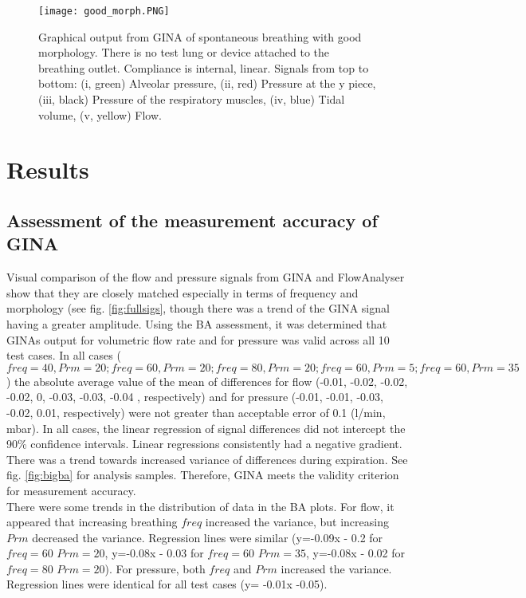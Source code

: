\documentclass[12pt, openany, oneside]{book}
\begin{document}

\begin{figure}
\centering
\texttt{[image: good\_morph.PNG]}		
	\caption[GINA spontaneous breaths with good morphology]{Graphical output from GINA of spontaneous breathing with good morphology. There is no test lung or device attached to the breathing outlet. Compliance is internal, linear. Signals from top to bottom: (i, green) Alveolar pressure, (ii, red) Pressure at the y piece, (iii, black) Pressure of the respiratory muscles, (iv, blue) Tidal volume, (v, yellow) Flow. }
	\label{fig:goodmorph}
\end{figure}


\section{Results}

\subsection{Assessment of the measurement accuracy of GINA}

Visual comparison of the flow and pressure signals from GINA and FlowAnalyser show that they are closely matched especially in terms of frequency and morphology (see fig. \ref{fig:fullsigs}, though there was a trend of the GINA signal having a greater amplitude. Using the BA assessment, it was determined that GINAs output for volumetric flow rate and for pressure was valid across all 10 test cases. In all cases ($freq = 40, Prm = 20; freq = 60, Prm = 20; freq = 80, Prm = 20; freq = 60, Prm = 5; freq = 60, Prm = 35$) the absolute average value of the mean of differences for flow (-0.01, -0.02, -0.02, -0.02, 0, -0.03, -0.03, -0.04 , respectively) and for pressure (-0.01, -0.01, -0.03, -0.02,  0.01, respectively)  were not greater than acceptable error of 0.1 (l/min, mbar). In all cases, the linear regression of signal differences did not intercept the 90{\%} confidence intervals. Linear regressions consistently had a negative gradient. There was a trend towards increased variance of differences during expiration. See fig. \ref{fig:bigba} for analysis samples. Therefore, GINA meets the validity criterion for measurement accuracy.\\

There were some trends in the distribution of data in the BA plots. For flow, it appeared that increasing breathing $freq$ increased the variance, but increasing $Prm$ decreased the variance. Regression lines were similar (y=-0.09x - 0.2 for $freq = 60$ $Prm = 20$, y=-0.08x - 0.03 for $freq = 60$ $Prm = 35$, y=-0.08x - 0.02 for $freq = 80$ $Prm = 20$). For pressure, both $freq$ and $Prm$ increased the variance. Regression lines were identical for all test cases (y= -0.01x -0.05).
\end{document}
